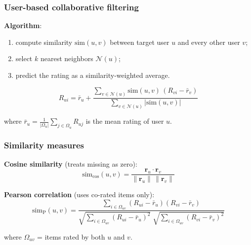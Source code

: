 \documentclass[]{beamer}
\begin{document}
\begin{frame}[fragile]
\frametitle{User-based collaborative filtering}
\textbf{Algorithm}:
\begin{enumerate}
  \item compute similarity $\mathrm{sim}(u, v)$ between target user $u$ and every other user $v$;
  \item select $k$ nearest neighbors $\mathcal{N}(u)$;
  \item predict the rating as a similarity-weighted average.
\end{enumerate}

\begin{equation*}
\hat{R}_{ui} = \bar{r}_u + \frac{\displaystyle\sum_{v \in \mathcal{N}(u)} \mathrm{sim}(u, v)\,(R_{vi} - \bar{r}_v)}{\displaystyle\sum_{v \in \mathcal{N}(u)} |\mathrm{sim}(u, v)|}
\end{equation*}

where $\bar{r}_u = \frac{1}{|\Omega_u|} \sum_{j \in \Omega_u} R_{uj}$ is the mean rating of user $u$.

\end{frame}

\begin{frame}[fragile]
\frametitle{Similarity measures}
\textbf{Cosine similarity} (treats missing as zero):
\begin{equation*}
\mathrm{sim}_{\cos}(u, v) = \frac{\mathbf{r}_u \cdot \mathbf{r}_v}{\|\mathbf{r}_u\|\,\|\mathbf{r}_v\|}
\end{equation*}

\textbf{Pearson correlation} (uses co-rated items only):
\begin{equation*}
\mathrm{sim}_{\mathrm{P}}(u, v) =
  \frac{\displaystyle\sum_{i \in \Omega_{uv}} (R_{ui} - \bar{r}_u)(R_{vi} - \bar{r}_v)}
       {\sqrt{\displaystyle\sum_{i \in \Omega_{uv}} (R_{ui} - \bar{r}_u)^2}\;
        \sqrt{\displaystyle\sum_{i \in \Omega_{uv}} (R_{vi} - \bar{r}_v)^2}}
\end{equation*}

where $\Omega_{uv}$ = items rated by both $u$ and $v$.

\end{frame}
\end{document}
